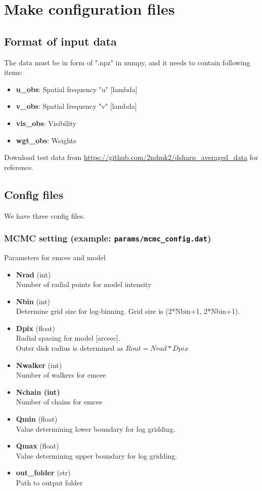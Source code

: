 \documentclass{report}
\begin{document}
\chapter{Make configuration files \label{sec:prep_sec}}

\section{Format of input data \label{sec:format_data}}
The data must be in form of ".npz" in numpy, and it needs to contain following items: 
\begin{itemize}
    \item \textbf{u\_obs}: Spatial frequency "u" [lambda]
    \item \textbf{v\_obs}: Spatial frequency "v" [lambda]
    \item \textbf{vis\_obs}: Visibility 
    \item \textbf{wgt\_obs}: Weights 
\end{itemize}
Download test data from \url{https://github.com/2ndmk2/dsharp_averaged_data} for reference. 


\section{Config files}
We have three config files. 
\subsection{MCMC setting (example: \texttt{params/mcmc\_config.dat}) \label{sec:mcmc_config}}
Parameters for emcee and model
\begin{itemize}
    \item \textbf{Nrad} (int) \\
    Number of radial points for model intensity
    \item \textbf{Nbin} (int)\\
    Determine grid size for log-binning. Grid size is (2*Nbin+1, 2*Nbin+1). 
    \item \textbf{Dpix} (float)\\
    Radial spacing for model [arcsec].\\ Outer disk radius is determined as $Rout = Nrad * Dpix$
    \item \textbf{Nwalker}  (int)\\
    Number of walkers for emcee
    \item \textbf{Nchain  (int)}\\
    Number of chains for emcee
    \item \textbf{Qmin}  (float)\\
    Value determining lower boundary for log gridding. 
    \item \textbf{Qmax} (float)\\
    Value determining upper boundary for log gridding. 
    \item \textbf{out\_folder} (str)\\
    Path to output folder
\end{itemize}
\end{document}
